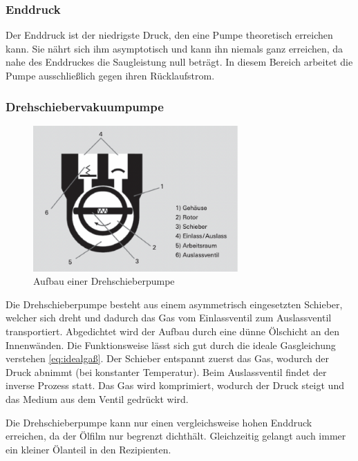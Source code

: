 \subsubsection*{Enddruck}
Der Enddruck ist der niedrigste Druck, den eine Pumpe theoretisch erreichen kann.
Sie nährt sich ihm asymptotisch und kann ihn niemals ganz erreichen,
da nahe des Enddruckes die Saugleistung null beträgt.
In diesem Bereich arbeitet die Pumpe ausschließlich gegen ihren Rücklaufstrom.

\subsubsection{Drehschiebervakuumpumpe}
\begin{figure}[h]
    \centering
    \includegraphics[width=0.7\textwidth]{abb/drehpumpe.png}
    \caption{Aufbau einer Drehschieberpumpe \cite{Pfeifer}} 
    \label{fig:drehpumpe}
\end{figure} 
Die Drehschieberpumpe besteht aus einem asymmetrisch eingesetzten Schieber, 
welcher sich dreht und dadurch das Gas vom Einlassventil zum Auslassventil transportiert.
Abgedichtet wird der Aufbau durch eine dünne Ölschicht an den Innenwänden.
Die Funktionsweise lässt sich gut durch die ideale Gasgleichung verstehen \eqref{eq:idealgaß}.
Der Schieber entspannt zuerst das Gas, 
wodurch der Druck abnimmt (bei konstanter Temperatur).
Beim Auslassventil findet der inverse Prozess statt.
Das Gas wird komprimiert, wodurch der Druck steigt 
und das Medium aus dem Ventil gedrückt wird.

Die Drehschieberpumpe kann nur einen vergleichsweise hohen Enddruck erreichen,
da der Ölfilm nur begrenzt dichthält.
Gleichzeitig gelangt auch immer ein kleiner Ölanteil in den Rezipienten.

